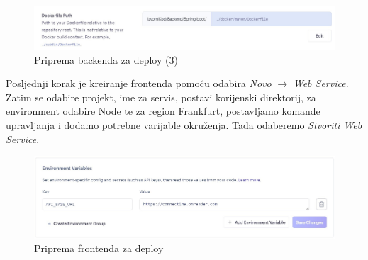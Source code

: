 			\begin{figure}[H]
				\includegraphics[width=\textwidth]{slike/Priprema_backenda3.jpg} 
				\centering
				\vspace{-0.2cm}
				\caption{Priprema backenda za deploy (3)}
				\label{back3}
			\end{figure}
			
			Posljednji korak je kreiranje frontenda pomoću odabira \textit{Novo} $\xrightarrow{}$ \textit{Web Service}. Zatim se odabire projekt, ime za servis, postavi korijenski direktorij, za environment odabire Node te za region Frankfurt, postavljamo komande upravljanja i dodamo potrebne varijable okruženja. Tada odaberemo \textit{Stvoriti Web Service}.
			
			
			\begin{figure}[H]
				\includegraphics[width=\textwidth]{slike/Priprema_frontenda.jpg} 
				\centering
				\vspace{-0.2cm}
				\caption{Priprema frontenda za deploy}
				\label{front}
			\end{figure}
			
			
			\eject 